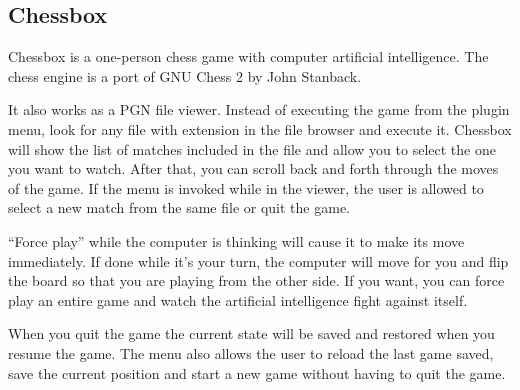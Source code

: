 \subsection{Chessbox}
Chessbox is a one-person chess game with computer artificial intelligence. 
The chess engine is a port of GNU Chess 2 by John Stanback.

It also works as a PGN file viewer. Instead of executing the game from the
plugin menu, look for any file with  extension in the file browser
and execute it. Chessbox will show the list of matches included in the file
and allow you to select the one you want to watch. After that, you can scroll
back and forth through the moves of the game. If the menu is invoked while in
the viewer, the user is allowed to select a new match from the same file or
quit the game.

``Force play'' while the computer is thinking will cause it to make its move
immediately.  If done while it's your turn, the computer will move
for you and flip the board so that you are playing from the other side.  If you
want, you can force play an entire game and watch the artificial intelligence
 fight against itself.

When you quit the game the current state will be saved and restored when
you resume the game. The menu also allows the user to reload the last game
saved, save the current position and start a new game without having to quit
the game.



